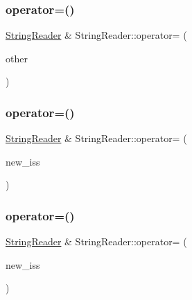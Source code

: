 \subsubsection{\texorpdfstring{operator=()}{operator=()}\hspace{0.1cm}{\footnotesize\ttfamily [2/4]}}
{\footnotesize\ttfamily \mbox{\hyperlink{classlucene_1_1core_1_1analysis_1_1StringReader}{String\+Reader}} \& String\+Reader\+::operator= (\begin{DoxyParamCaption}\item[{\mbox{\hyperlink{classlucene_1_1core_1_1analysis_1_1StringReader}{String\+Reader}} \&\&}]{other }\end{DoxyParamCaption})}

\mbox{\label{classlucene_1_1core_1_1analysis_1_1StringReader_ae7440c5e8b7dd6f71a12986c55744e42}} 
\subsubsection{\texorpdfstring{operator=()}{operator=()}\hspace{0.1cm}{\footnotesize\ttfamily [3/4]}}
{\footnotesize\ttfamily \mbox{\hyperlink{classlucene_1_1core_1_1analysis_1_1StringReader}{String\+Reader}} \& String\+Reader\+::operator= (\begin{DoxyParamCaption}\item[{std\+::istringstream \&}]{new\+\_\+iss }\end{DoxyParamCaption})}

\mbox{\label{classlucene_1_1core_1_1analysis_1_1StringReader_a5278369c965094572c0b582fa87fe9ce}} 
\subsubsection{\texorpdfstring{operator=()}{operator=()}\hspace{0.1cm}{\footnotesize\ttfamily [4/4]}}
{\footnotesize\ttfamily \mbox{\hyperlink{classlucene_1_1core_1_1analysis_1_1StringReader}{String\+Reader}} \& String\+Reader\+::operator= (\begin{DoxyParamCaption}\item[{std\+::istringstream \&\&}]{new\+\_\+iss }\end{DoxyParamCaption})}

